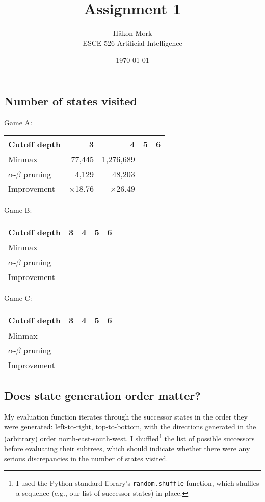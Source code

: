 \documentclass[letterpaper, 12pt]{article}
\title{\textbf{Assignment 1}}
\author{Håkon Mork \\ ESCE 526 Artificial Intelligence}
\date{\today}
\numberwithin{theorem}{section}
\begin{document}
\maketitle
\noindent

\section{}
\subsection{Number of states visited}
Game A:
\begin{table}[h]
	\centering
	\small
	\begin{tabular}{lrrrr}
		Cutoff depth & 3 & 4 & 5 & 6 \\
		\midrule
		Minmax & 77,445 & 1,276,689 & & \\
		$\alpha$-$\beta$ pruning & 4,129 & 48,203 && \\
		\midrule
		Improvement & $\times$18.76 & $\times$26.49
	\end{tabular}
\end{table}

\noindent Game B:
\begin{table}[h]
	\centering
	\small
	\begin{tabular}{lrrrr}
		Cutoff depth & 3 & 4 & 5 & 6 \\
		\midrule
		Minmax & & & & \\
		$\alpha$-$\beta$ pruning & & & & \\
		\midrule
		Improvement & & & &
	\end{tabular}
\end{table}

\noindent Game C:
\begin{table}[h]
	\centering
	\small
	\begin{tabular}{lrrrr}
		Cutoff depth & 3 & 4 & 5 & 6 \\
		\midrule
		Minmax & & & & \\
		$\alpha$-$\beta$ pruning & & & & \\
		\midrule
		Improvement & & & &
	\end{tabular}
\end{table}


\subsection{Does state generation order matter?}
My evaluation function iterates through the successor states in the order they were generated: left-to-right, top-to-bottom, with the directions generated in the (arbitrary) order north-east-south-west. I shuffled\footnote{I used the Python standard library's \texttt{random.shuffle} function, which shuffles a sequence (e.g., our list of successor states) in place.} the list of possible successors before evaluating their subtrees, which should indicate whether there were any serious discrepancies in the number of states visited. 
\end{document}
